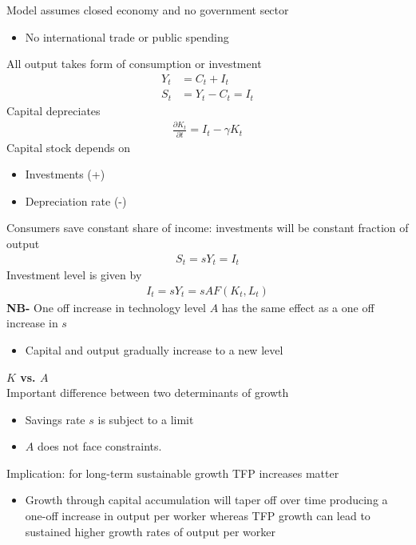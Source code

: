 \documentclass{beamer}
\begin{document}
\begin{frame}
  Model assumes closed economy and no government sector
  \begin{itemize}
    \item No international trade or public spending
  \end{itemize}
  \medskip
  All output takes form of consumption or investment
  \begin{align}
       Y_t &= C_t+I_t\\
       S_t &= Y_t-C_t=I_t
  \end{align}
  \medskip
  Capital depreciates
\begin{align*}
  \frac{\partial K_t}{\partial t}=I_t -\gamma K_t
\end{align*}
Capital stock depends on 
\begin{itemize}
  \item Investments (+)
  \item Depreciation rate (-)
\end{itemize}
\end{frame}

\begin{frame}
  Consumers save constant share of income: investments will be constant fraction of output
\begin{align}
  S_t = sY_t = I_t
\end{align}
Investment level is given by
\begin{align}
  I_t=sY_t=sAF(K_t,L_t)
\end{align}
 \textbf{NB-} One off increase in technology level $A$ has the same effect as a one off increase in $s$ 
 \begin{itemize}
   \item Capital and output gradually increase to a new level
 \end{itemize}
\end{frame}

\begin{frame}
  \textbf{$K$ vs. $A$}\\
  Important difference between two determinants of growth
  \begin{itemize}
    \item Savings rate $s$ is subject to a limit
    \item $A$ does not face constraints. 
  \end{itemize}
  \medskip
  Implication: for long-term sustainable growth TFP increases matter
  \begin{itemize}
    \item Growth through capital accumulation will taper off over time producing a one-off increase in output per worker whereas TFP growth can lead to sustained higher growth rates of output per worker
  \end{itemize}
\end{frame}
\end{document}
